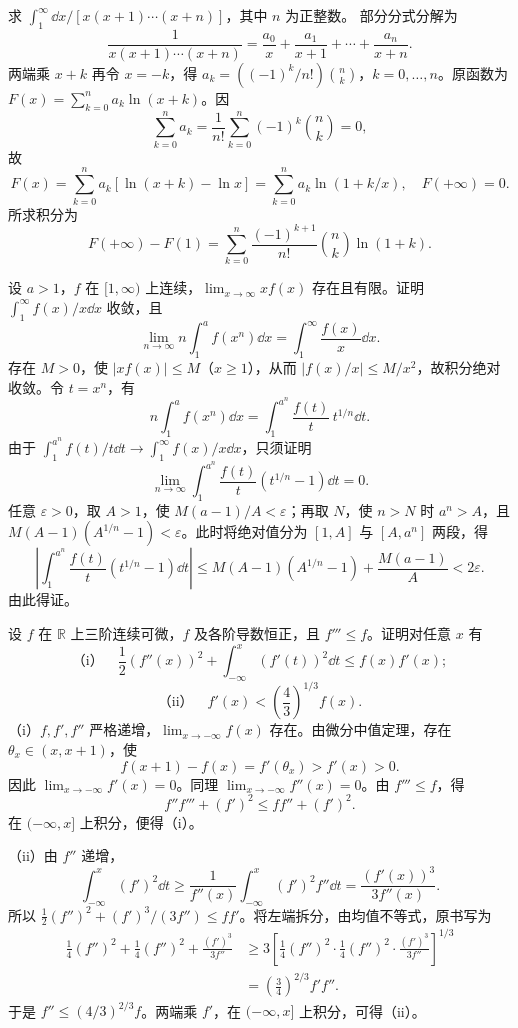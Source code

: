 求 $\int_1^\infty\dd x/[x(x+1)\cdots(x+n)]$，其中 $n$ 为正整数。
\sol 部分分式分解为
\[
\frac1{x(x+1)\cdots(x+n)}=\frac{a_0}x+\frac{a_1}{x+1}+\cdots+\frac{a_n}{x+n}.
\]
两端乘 $x+k$ 再令 $x=-k$，得 $a_k=((-1)^k/n!)\binom nk$，$k=0,\ldots,n$。原函数为
$F(x)=\sum_{k=0}^na_k\ln(x+k)$。因
\[
\sum_{k=0}^na_k=\frac1{n!}\sum_{k=0}^n(-1)^k\binom nk=0,
\]
故
\[
F(x)=\sum_{k=0}^na_k[\ln(x+k)-\ln x]=\sum_{k=0}^na_k\ln(1+k/x),\quad F(+\infty)=0.
\]
所求积分为
\[
F(+\infty)-F(1)=\sum_{k=0}^n\frac{(-1)^{k+1}}{n!}\binom nk\ln(1+k).
\]

设 $a>1$，$f$ 在 $[1,\infty)$ 上连续，$\lim_{x\to\infty}xf(x)$ 存在且有限。证明 $\int_1^\infty f(x)/x\dd x$ 收敛，且
\[
\lim_{n\to\infty}n\int_1^af(x^n)\dd x=\int_1^\infty\frac{f(x)}x\dd x.
\]
\prooftext 存在 $M>0$，使 $|xf(x)|\le M$（$x\ge1$），从而 $|f(x)/x|\le M/x^2$，故积分绝对收敛。令 $t=x^n$，有
\[
n\int_1^af(x^n)\dd x=\int_1^{a^n}\frac{f(t)}t\,t^{1/n}\dd t.
\]
由于 $\int_1^{a^n}f(t)/t\dd t\to\int_1^\infty f(x)/x\dd x$，只须证明
\begin{equation}
\lim_{n\to\infty}\int_1^{a^n}\frac{f(t)}t(t^{1/n}-1)\dd t=0.\tag{6.1.2}
\end{equation}
任意 $\varepsilon>0$，取 $A>1$，使 $M(a-1)/A<\varepsilon$；再取 $N$，使 $n>N$ 时 $a^n>A$，且 $M(A-1)(A^{1/n}-1)<\varepsilon$。此时将绝对值分为 $[1,A]$ 与 $[A,a^n]$ 两段，得
\[
\left|\int_1^{a^n}\frac{f(t)}t(t^{1/n}-1)\dd t\right|
\le M(A-1)(A^{1/n}-1)+\frac{M(a-1)}A<2\varepsilon.
\]
由此得证。

设 $f$ 在 $\mathbb R$ 上三阶连续可微，$f$ 及各阶导数恒正，且 $f'''\le f$。证明对任意 $x$ 有
\[
\text{（i）}\quad\frac12(f''(x))^2+\int_{-\infty}^x(f'(t))^2\dd t\le f(x)f'(x);
\]
\[
\text{（ii）}\quad f'(x)<\left(\frac43\right)^{1/3}f(x).
\]
\prooftext （i）$f,f',f''$ 严格递增，$\lim_{x\to-\infty}f(x)$ 存在。由微分中值定理，存在 $\theta_x\in(x,x+1)$，使
\[
f(x+1)-f(x)=f'(\theta_x)>f'(x)>0.
\]
因此 $\lim_{x\to-\infty}f'(x)=0$。同理 $\lim_{x\to-\infty}f''(x)=0$。由 $f'''\le f$，得
\[
f''f'''+(f')^2\le ff''+(f')^2.
\]
在 $(-\infty,x]$ 上积分，便得（i）。

（ii）由 $f''$ 递增，
\[
\int_{-\infty}^x(f')^2\dd t
\ge\frac1{f''(x)}\int_{-\infty}^x(f')^2f''\dd t
=\frac{(f'(x))^3}{3f''(x)}.
\]
所以 $\frac12(f'')^2+(f')^3/(3f'')\le ff'$。将左端拆分，由均值不等式，原书写为
\begin{align*}
\frac14(f'')^2+\frac14(f'')^2+\frac{(f')^3}{3f''}
&\ge3\left[\frac14(f'')^2\cdot\frac14(f'')^2\cdot\frac{(f')^3}{3f''}\right]^{1/3}\\
&=\left(\frac34\right)^{2/3}f'f''.
\end{align*}
于是 $f''\le(4/3)^{2/3}f$。两端乘 $f'$，在 $(-\infty,x]$ 上积分，可得（ii）。
